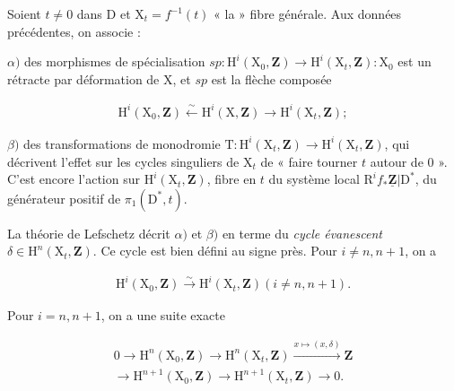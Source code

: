 \documentclass[10pt,leqno]{article}
\begin{document}
\noindent Soient \(t\ne 0\) dans \(\mathrm{D}\) et \(\mathrm{X}_{t}=f^{- 1}(t)\) « la » fibre générale. Aux données précédentes, on associe :\par

\noindent \(\alpha )\) des morphismes de spécialisation \(\mathit{sp} : \mathrm{H}^{i}(\mathrm{X}_{0},\mathbf{Z})\longrightarrow \mathrm{H}^{i}(\mathrm{X}_{t},\mathbf{Z}) : \mathrm{X}_{0}\) est un rétracte par déformation de \(\mathrm{X}\), et \(\mathit{sp}\) est la flèche composée\par

\begin{equation*}\begin{gathered}\mathrm{H}^{i}(\mathrm{X}_{0},\mathbf{Z}) \xleftarrow{\sim } \mathrm{H}^{i}(\mathrm{X},\mathbf{Z}) \longrightarrow  \mathrm{H}^{i}(\mathrm{X}_{t},\mathbf{Z});\end{gathered}\end{equation*}

\noindent \(\beta )\) des transformations de monodromie \(\mathrm{T} : \mathrm{H}^{i}(\mathrm{X}_{t},\mathbf{Z})\longrightarrow \mathrm{H}^{i}(\mathrm{X}_{t},\mathbf{Z})\), qui décrivent l’effet sur les cycles singuliers de \(\mathrm{X}_{t}\) de « faire tourner \(t\) autour de 0 ». C’est encore l’action sur \(\mathrm{H}^{i}(\mathrm{X}_{t},\mathbf{Z})\), fibre en \(t\) du système local \(\mathrm{R}^{i} f_{*}\underline{\mathbf{Z}}|\mathrm{D}^{*}\), du générateur positif de \(\pi _{1}(\mathrm{D}^{*},t)\).\par

\noindent La théorie de Lefschetz décrit \(\alpha )\) et \(\beta )\) en terme du \emph{cycle évanescent} \(\delta \in \mathrm{H}^{n}(\mathrm{X}_{t},\mathbf{Z})\). Ce cycle est bien défini au signe près. Pour \(i\ne n,n+1\), on a\par

\begin{equation*}\begin{gathered}\mathrm{H}^{i}(\mathrm{X}_{0},\mathbf{Z}) \xrightarrow{\sim } \mathrm{H}^{i}(\mathrm{X}_{t},\mathbf{Z})    (i\ne n,n+1).\end{gathered}\end{equation*}

\noindent Pour \(i=n,n+1\), on a une suite exacte\par

\begin{equation*}\begin{gathered}0 \longrightarrow  \mathrm{H}^{n}(\mathrm{X}_{0},\mathbf{Z}) \longrightarrow  \mathrm{H}^{n}(\mathrm{X}_{t},\mathbf{Z}) \xrightarrow{x\longmapsto (x,\delta )} \mathbf{Z} \\ \longrightarrow  \mathrm{H}^{n+1}(\mathrm{X}_{0},\mathbf{Z}) \longrightarrow  \mathrm{H}^{n+1}(\mathrm{X}_{t},\mathbf{Z}) \longrightarrow  0.\end{gathered}\end{equation*}
\end{document}
